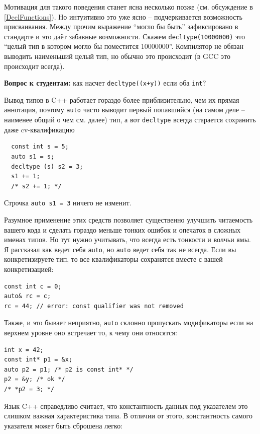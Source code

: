 \documentclass[a4paper,12pt,oneside]{article}
\newif\ifanswers
\begin{document}
Мотивация для такого поведения станет ясна несколько позже (см. обсуждение в \ref{DeclFunctions}). Но интуитивно это уже ясно -- подчеркивается возможность присваивания. Между прочим выражение ``могло бы быть'' зафиксировано в стандарте и это даёт забавные возможности. Скажем \lstinline!decltype(10000000)! это ``целый тип в котором могло бы поместится 10000000''. Компилятор не обязан выводить наименьший целый тип, но обычно это происходит (в GCC это происходит всегда).

\textbf{Вопрос к студентам:} как насчет \lstinline!decltype((x+y))! если оба \lstinline!int!?

\ifanswers
Правильный ответ: конечно же сумма это не lvalue.
\fi

Вывод типов в C++ работает гораздо более приблизительно, чем их прямая аннотация, поэтому \lstinline!auto! часто выводит первый попавшийся (на самом деле -- наименее общий о чем см. далее) тип, а вот \lstinline!decltype! всегда старается сохранить даже cv-квалификацию

\begin{lstlisting}
  const int s = 5;
  auto s1 = s;
  decltype (s) s2 = 3;
  s1 += 1;
  /* s2 += 1; */
\end{lstlisting}

Строчка \lstinline!auto s1 = 3! ничего не изменит.

Разумное применение этих средств позволяет существенно улучшить читаемость вашего кода и сделать гораздо меньше тонких ошибок и опечаток в сложных именах типов. Но тут нужно учитывать, что всегда есть тонкости и волчьи ямы. Я рассказал как ведет себя \lstinline!auto!, но \lstinline!auto! ведет себя так не всегда. Если вы конкретизируете тип, то все квалификаторы сохранятся вместе с вашей конкретизацией:

\begin{lstlisting}
const int c = 0;
auto& rc = c;
rc = 44; // error: const qualifier was not removed
\end{lstlisting}

Также, и это бывает неприятно, \lstinline!auto! склонно пропускать модификаторы если на верхнем уровне оно встречает то, к чему они относятся:

\begin{lstlisting}
int x = 42;
const int* p1 = &x;
auto p2 = p1; /* p2 is const int* */
p2 = &y; /* ok */
/* *p2 = 3; */
\end{lstlisting}

Язык C++ справедливо считает, что константность данных под указателем это слишком важная характеристика типа. В отличии от этого, константность самого указателя может быть сброшена легко:
\end{document}
